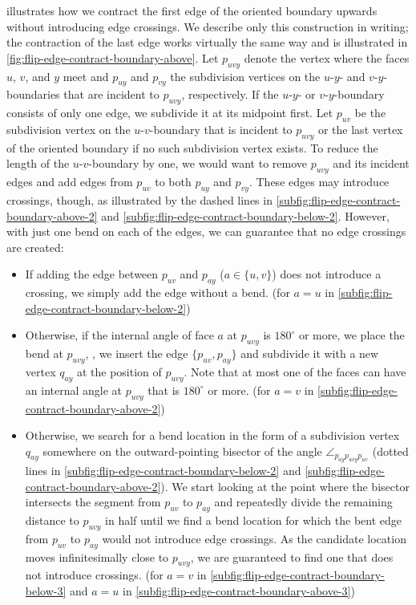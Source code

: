  illustrates how we contract the first edge of the oriented boundary upwards without introducing edge crossings.
We describe only this construction in writing; the contraction of the last edge works virtually the same way and is illustrated in \cref{fig:flip-edge-contract-boundary-above}.
Let $p_{uvy}$ denote the vertex where the faces $u$, $v$, and $y$ meet and $p_{uy}$ and $p_{vy}$ the subdivision vertices on the $u$-$y$- and $v$-$y$-boundaries that are incident to $p_{uvy}$, respectively.
If the $u$-$y$- or $v$-$y$-boundary consists of only one edge, we subdivide it at its midpoint first.
Let $p_{uv}$ be the subdivision vertex on the $u$-$v$-boundary that is incident to $p_{uvy}$ or the last vertex of the oriented boundary if no such subdivision vertex exists.
To reduce the length of the $u$-$v$-boundary by one, we would want to remove $p_{uvy}$ and its incident edges and add edges from $p_{uv}$ to both $p_{uy}$ and $p_{vy}$.
These edges may introduce crossings, though, as illustrated by the dashed lines in \cref{subfig:flip-edge-contract-boundary-above-2} and \cref{subfig:flip-edge-contract-boundary-below-2}.
However, with just one bend on each of the edges, we can guarantee that no edge crossings are created:

\begin{itemize}
\item If adding the edge between $p_{uv}$ and $p_{ay}$ ($a \in \{u,v\}$) does not introduce a crossing, we simply add the edge without a bend.
(for $a = u$ in \cref{subfig:flip-edge-contract-boundary-below-2})
\item Otherwise, if the internal angle of face $a$ at $p_{uvy}$ is $180^\circ$ or more, we place the bend at $p_{uvy}$, \ie{}, we insert the edge $\{p_{uv},p_{ay}\}$ and subdivide it with a new vertex $q_{ay}$ at the position of $p_{uvy}$.
Note that at most one of the faces can have an internal angle at $p_{uvy}$ that is $180^\circ$ or more.
(for $a = v$ in \cref{subfig:flip-edge-contract-boundary-above-2})
\item Otherwise, we search for a bend location in the form of a subdivision vertex $q_{ay}$ somewhere on the outward-pointing bisector of the angle $\angle_{p_{ay}p_{uvy}p_{uv}}$ (dotted lines in \cref{subfig:flip-edge-contract-boundary-below-2} and \cref{subfig:flip-edge-contract-boundary-above-2}).
We start looking at the point where the bisector intersects the segment from $p_{uv}$ to $p_{ay}$ and repeatedly divide the remaining distance to $p_{uvy}$ in half until we find a bend location for which the bent edge from $p_{uv}$ to $p_{ay}$ would not introduce edge crossings.
As the candidate location moves infinitesimally close to $p_{uvy}$, we are guaranteed to find one that does not introduce crossings.
(for $a = v$ in \cref{subfig:flip-edge-contract-boundary-below-3} and $a = u$ in \cref{subfig:flip-edge-contract-boundary-above-3})
\end{itemize}

